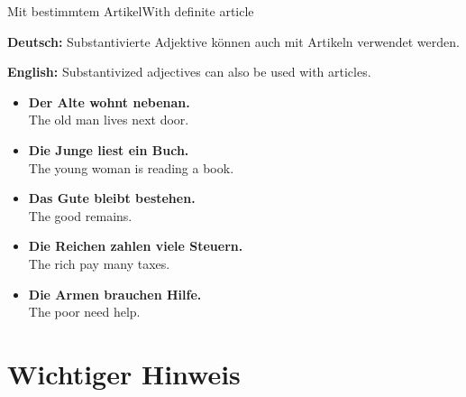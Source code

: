 \documentclass[a4paper,11pt]{article}
\newcommand{\GermanText}[1]{\textbf{Deutsch: }#1\par}
\newcommand{\EnglishText}[1]{{\small\color{SoftGray}\textbf{English: }#1\par}}
\newcommand{\ExampleItem}[2]{\item \textbf{#1}\\{\small\color{SoftGray}#2}}
\begin{document}
        \begin{grammarentry}{Mit bestimmtem Artikel}{With definite article}
            
            \GermanText{
                Substantivierte Adjektive k\"onnen auch mit Artikeln verwendet werden.
            }
            
            \EnglishText{
                Substantivized adjectives can also be used with articles.
            }
            
            \begin{exbox}
                
                \begin{itemize}
                    
                    \ExampleItem
                    {Der Alte wohnt nebenan.}
                    {The old man lives next door.}
                    
                    \ExampleItem
                    {Die Junge liest ein Buch.}
                    {The young woman is reading a book.}
                    
                    \ExampleItem
                    {Das Gute bleibt bestehen.}
                    {The good remains.}
                    
                    \ExampleItem
                    {Die Reichen zahlen viele Steuern.}
                    {The rich pay many taxes.}
                    
                    \ExampleItem
                    {Die Armen brauchen Hilfe.}
                    {The poor need help.}
                
                \end{itemize}
            
            \end{exbox}
        
        \end{grammarentry}
    
    
    \section{Wichtiger Hinweis}
        
\end{document}

